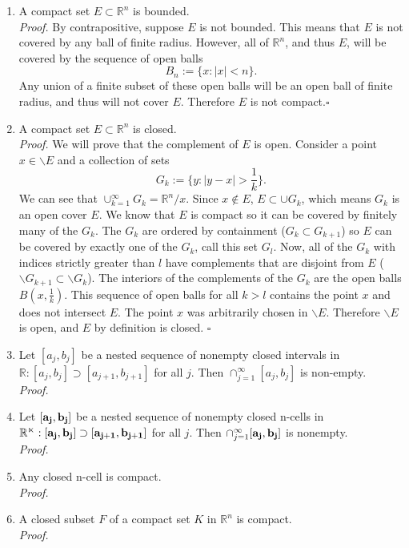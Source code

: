 \documentclass[10pt]{article}
\theoremstyle{plain}
\theoremstyle{remark}
\begin{document}
\begin{enumerate}
  \item A compact set $E \subset \mathbb{R}^n$ is bounded.\\
  \textit{Proof.} By contrapositive, suppose $E$ is not bounded. This means that $E$ is not covered by any ball of
  finite radius. However, all of $\mathbb{R}^n$, and thus $E$, will be covered by the sequence of open balls
  $$B_n := \{ x:\left|x\right|< n\}.$$ Any union of a finite subset of these open balls will be an open ball of finite
  radius, and thus will not cover $E$. Therefore $E$ is not compact.$\square$\\

  \item A compact set $E \subset \mathbb{R}^n$ is closed.\\
  \textit{Proof.} We will prove that the complement of $E$ is open. Consider a point $x \in \backslash E$ and a collection of sets
  $$G_k := \{ y : |y-x| > \frac{1}{k} \}.$$ We can see that $\cup_{k=1}^{\infty}G_k=\mathbb{R}^n/x$. Since $x \notin E$,
  $E \subset \cup G_k$, which means $G_k$ is an open cover $E$. We know that $E$ is compact so it can be covered by
  finitely many of the $G_k$. The $G_k$ are ordered by containment ($G_k \subset G_{k+1}$) so $E$ can be covered by
  exactly one of the $G_k$, call this set $G_l$. Now, all of the $G_{k}$ with indices strictly greater than $l$ have
  complements that are disjoint from $E$ ($\backslash G_{k+1} \subset \backslash G_k$). The interiors of the complements
  of the $G_k$ are the open balls $B(x, \frac{1}{k})$. This sequence of open balls for all $k > l$ contains the point
  $x$ and does not intersect $E$. The point $x$ was arbitrarily chosen in $\backslash E$. Therefore $\backslash E$ is
  open, and $E$ by definition is closed. $\square$\\

  \item Let $[a_j,b_j]$ be a nested sequence of nonempty closed intervals in $\mathbb{R}:[a_j,b_j] \supset [a_{j+1},
        b_{j+1}]$ for all $j$. Then $\cap_{j=1}^{\infty}[a_j,b_j]$ is non-empty.\\
  \textit{Proof.}


  \item Let $[\bf{a}_j,\bf{b}_j]$ be a nested sequence of nonempty closed n-cells in $\mathbb{R^n}:[\bf{a}_j,\bf{b}_j]
        \supset [\bf{a}_{j+1},\bf{b}_{j+1}]$ for all $j$. Then $\cap_{j=1}^{\infty} [\bf{a}_j,\bf{b}_j]$ is nonempty.\\
  \textit{Proof.}


  \item Any closed n-cell is compact.\\
  \textit{Proof.}


  \item A closed subset $F$ of a compact set $K$ in $\mathbb{R}^n$ is compact.\\
  \textit{Proof.}

\end{enumerate}
\end{document}

